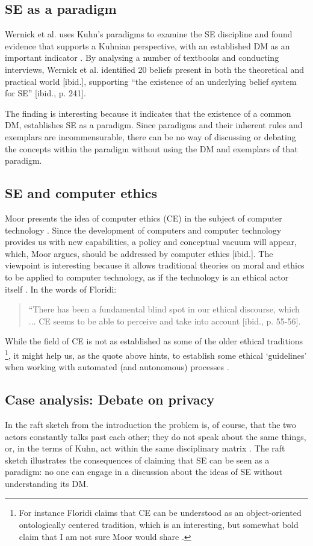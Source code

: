 \documentclass{article}
\begin{document}
\subsection{SE as a paradigm}
Wernick et al. uses Kuhn's paradigms to examine the SE discipline and found evidence that supports a Kuhnian perspective, with an established DM as an important indicator \citep[p. 240]{Wernick:2004}. By analysing a number of textbooks and conducting interviews, Wernick et al. identified 20 beliefs present in both the theoretical and practical world [ibid.], supporting ``the existence of an underlying belief system for SE'' [ibid., p. 241].

The finding is interesting because it indicates that the existence of a common DM, establishes SE as a paradigm. Since paradigms and their inherent rules and exemplars are incommensurable, there can be no way of discussing or debating the concepts within the paradigm without using the DM and exemplars of that paradigm.

\subsection{SE and computer ethics}
Moor presents the idea of computer ethics (CE) in the subject of computer technology \citep{Moor:1985}. Since the development of computers and computer technology provides us with new capabilities, a policy and conceptual vacuum will appear, which, Moor argues, should be addressed by computer ethics [ibid.]. The viewpoint is interesting because it allows traditional theories on moral and ethics to be applied to computer technology, as if the technology is an ethical actor itself \citep{Floridi:1999}. In the words of Floridi:
\begin{quote}
``There has been a fundamental blind spot in our ethical discourse, which ... CE seems to be able to perceive and take into account [ibid., p. 55-56].
\end{quote}
While the field of CE is not as established as some of the older ethical traditions \footnote{For instance Floridi claims that CE can be understood as an object-oriented ontologically centered tradition, which is an interesting, but somewhat bold claim that I am not sure Moor would share \citep{Floridi:1999}.}, it might help us, as the quote above hints, to establish some ethical `guidelines' when working with automated (and autonomous) processes  \citep{Jensen:2014}.

\subsection{Case analysis: Debate on privacy}
In the raft sketch from the introduction the problem is, of course, that the two actors constantly talks past each other; they do not speak about the same things, or, in the terms of Kuhn, act within the same disciplinary matrix \citep{Holm:2014}. The raft sketch illustrates the consequences of claiming that SE can be seen as a paradigm: no one can engage in a discussion about the ideas of SE without understanding its DM.
\end{document}
